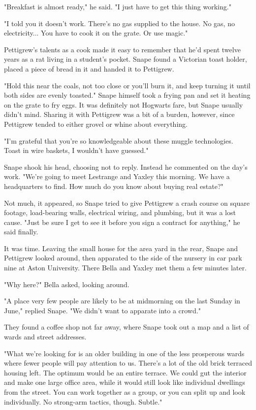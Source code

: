 \documentclass[a4paper,11pt]{article}
\begin{document}
"Breakfast is almost ready," he said. "I just have to get this thing working."

"I told you it doesn't work. There's no gas supplied to the house. No gas, no electricity... You have to cook it on the grate. Or use magic."

Pettigrew's talents as a cook made it easy to remember that he'd spent twelve years as a rat living in a student's pocket. Snape found a Victorian toast holder, placed a piece of bread in it and handed it to Pettigrew.

"Hold this near the coals, not too close or you'll burn it, and keep turning it until both sides are evenly toasted." Snape himself took a frying pan and set it heating on the grate to fry eggs. It was definitely not Hogwarts fare, but Snape usually didn't mind. Sharing it with Pettigrew was a bit of a burden, however, since Pettigrew tended to either grovel or whine about everything.

"I'm grateful that you're so knowledgeable about these muggle technologies. Toast in wire baskets, I wouldn't have guessed."

Snape shook his head, choosing not to reply. Instead he commented on the day's work. "We're going to meet Lestrange and Yaxley this morning. We have a headquarters to find. How much do you know about buying real estate?"

Not much, it appeared, so Snape tried to give Pettigrew a crash course on square footage, load-bearing walls, electrical wiring, and plumbing, but it was a lost cause. "Just be sure I get to see it before you sign a contract for anything," he said finally.

It was time. Leaving the small house for the area yard in the rear, Snape and Pettigrew looked around, then apparated to the side of the nursery in car park nine at Aston University. There Bella and Yaxley met them a few minutes later.

"Why here?" Bella asked, looking around.

"A place very few people are likely to be at midmorning on the last Sunday in June," replied Snape. "We didn't want to apparate into a crowd."

They found a coffee shop not far away, where Snape took out a map and a list of wards and street addresses.

"What we're looking for is an older building in one of the less prosperous wards where fewer people will pay attention to us. There's a lot of the old brick terraced housing left. The optimum would be an entire terrace. We could gut the interior and make one large office area, while it would still look like individual dwellings from the street. You can work together as a group, or you can split up and look individually. No strong-arm tactics, though. Subtle."
\end{document}
